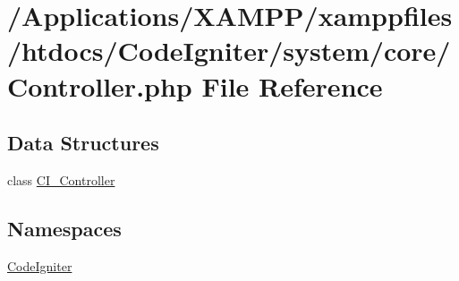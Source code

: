 \hypertarget{_controller_8php}{}\section{/\+Applications/\+X\+A\+M\+P\+P/xamppfiles/htdocs/\+Code\+Igniter/system/core/\+Controller.php File Reference}
\label{_controller_8php}
\subsection*{Data Structures}
\begin{DoxyCompactItemize}
\item 
class \mbox{\hyperlink{class_c_i___controller}{C\+I\+\_\+\+Controller}}
\end{DoxyCompactItemize}
\subsection*{Namespaces}
\begin{DoxyCompactItemize}
\item 
 \mbox{\hyperlink{namespace_code_igniter}{Code\+Igniter}}
\end{DoxyCompactItemize}
